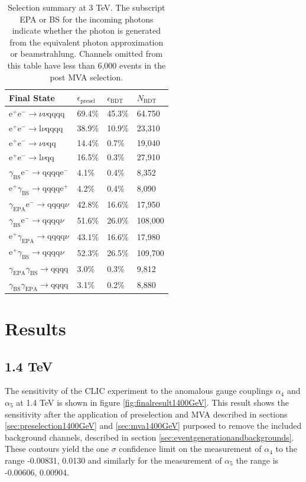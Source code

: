 \begin{table}[h!]
\centering
\begin{tabular}{ l l l l}
\hline
Final State & $\epsilon_{\text{presel}}$ & $\epsilon_{\text{BDT}}$ & $N_{\text{BDT}}$ \\ 
\hline
$\text{e}^{+}\text{e}^{-} \rightarrow \nu{\nu}\text{qqqq}$ & 69.4\% & 45.3\% & 64.750 \\
$\text{e}^{+}\text{e}^{-} \rightarrow \text{l}\nu\text{qqqq}$ & 38.9\% & 10.9\% & 23,310 \\
$\text{e}^{+}\text{e}^{-} \rightarrow \nu{\nu}\text{qq}$ & 14.4\% & 0.7\% & 19,040 \\
$\text{e}^{+}\text{e}^{-} \rightarrow \text{l}\nu\text{qq}$ & 16.5\% & 0.3\% & 27,910 \\
$\gamma_{\text{BS}}\text{e}^{-} \rightarrow \text{qqqq}\text{e}^{-}$ & 4.1\% & 0.4\% & 8,352 \\
$\text{e}^{+}\gamma_{\text{BS}} \rightarrow \text{qqqq}\text{e}^{+}$ & 4.2\% & 0.4\% & 8,090 \\
$\gamma_{\text{EPA}}\text{e}^{-} \rightarrow \text{qqqq}\nu$ & 42.8\% & 16.6\% & 17,950 \\
$\gamma_{\text{BS}}\text{e}^{-} \rightarrow \text{qqqq}\nu$ & 51.6\% & 26.0\% & 108,000 \\
$\text{e}^{+}\gamma_{\text{EPA}} \rightarrow \text{qqqq}\nu$ & 43.1\% & 16.6\% & 17,980 \\
$\text{e}^{+}\gamma_{\text{BS}} \rightarrow \text{qqqq}\nu$ & 52.3\% & 26.5\% & 109,700 \\
$\gamma_{\text{EPA}}\gamma_{\text{BS}} \rightarrow \text{qqqq}$ & 3.0\% & 0.3\% & 9,812 \\
$\gamma_{\text{BS}}\gamma_{\text{EPA}} \rightarrow \text{qqqq}$ & 3.1\% & 0.2\% & 8,880 \\
\hline
\end{tabular}
\caption[Selection summary at 3 TeV.]{Selection summary at 3 TeV.   The subscript EPA or BS for the incoming photons indicate whether the photon is generated from the equivalent photon approximation or beamstrahlung.  Channels omitted from this table have less than 6,000 events in the post MVA selection.}
\label{table:selectionsummary3000GeV}
\end{table}

\section{Results}
\subsection{1.4 TeV}
The sensitivity of the CLIC experiment to the anomalous gauge couplings $\alpha_{4}$ and $\alpha_{5}$ at 1.4 TeV is shown in figure \ref{fig:finalresult1400GeV}.  This result shows the sensitivity after the application of preselection and MVA described in sections \ref{sec:preselection1400GeV} and \ref{sec:mva1400GeV} purposed to remove the included background channels, described in section \ref{sec:eventgenerationandbackgrounds}.  These contours yield the one $\sigma$ confidence limit on the measurement of $\alpha_{4}$ to the range -0.00831, 0.0130 and similarly for the measurement of $\alpha_{5}$ the range is -0.00606, 0.00904.

